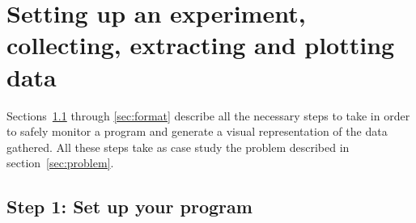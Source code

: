 \section{Setting up an experiment, collecting, extracting and plotting data}
\label{sec:process}
Sections~\ref{sec:setup} through \ref{sec:format} describe all the necessary steps to take in order to safely monitor a program and generate a visual representation of the data gathered. All these steps take as case study the problem described in section~\ref{sec:problem}.

\subsection{Step 1: Set up your program}
\label{sec:setup}



